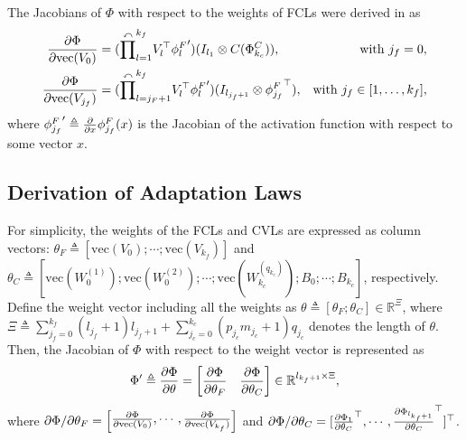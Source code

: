 \documentclass{l4dc2025}
\begin{document}
The Jacobians of $\Phi$ with respect to the weights of FCLs were derived in \cite{DixonDNN} as
\begin{equation}
    \begin{aligned}
    \frac{\partial \Phi}{\partial \text{vec}( V_0)} &= 
        (\overset{\curvearrowleft}\prod^{k_f}_{l=1}  V^\top  _l{\phi^{F}_l}') ( I_{l_{1}} \otimes C(\Phi^C_{k_c})),
    &\text{with }{j_f} =0, \hfilneg
    \\
    {\partial \Phi\over\partial \text{vec}(V_{j_f})} &=  
        (\overset{\curvearrowleft}\prod^{k_f}_{l={j_F}+1} V^\top  _l{\phi^{F}_l}') ( I_{l_{{j_f}+1}} \otimes {\phi_{j_f}^F}^\top  ), 
    &\text{with } {j_f} \in[1,\dots,k_f], \hfilneg
    \end{aligned}
\end{equation}
where ${\phi^F_{j_f}}'\triangleq {\partial \over \partial x} {\phi^F_{j_f}}(x)$ is the Jacobian of the activation function with respect to some vector $x$. 

\subsection{Derivation of Adaptation Laws} 

For simplicity, the weights of the FCLs and CVLs are expressed as column vectors:
$\theta_F \triangleq [\text{vec}( V_{0});\allowbreak\cdots;\text{vec}( V_{k_f})]$ and $\theta_C \triangleq [\text{vec}(W^{(1)}_0);\text{vec}(W^{(2)}_0);\cdots;\text{vec}(W^{(q_{k_c})}_{k_c});B_0;\cdots;B_{k_c}]$, respectively. 
Define the weight vector including all the weights as $\theta\triangleq [\theta_F;\theta_C]\in\mathbb{R}^\Xi$, where $\Xi\triangleq\sum_{j_f=0}^{k_f} (l_{j_f}+1) l_{j_f+1} + {\sum_{j_c=0}^{k_c} (p_{j_c}m_{j_c}+1)q_{j_c}}$ denotes the length of $\theta$. 
Then, the Jacobian of $\Phi$ with respect to the weight vector is represented as
\begin{equation}
    \Phi'\triangleq 
    {\partial \Phi\over\partial \theta} = 
    \begin{bmatrix}
        \dfrac{\partial \Phi}{\partial \theta_F} & \dfrac{\partial \Phi}{\partial \theta_C}
    \end{bmatrix}
    \in\mathbb{R}^{l_{k_f+1}\times \Xi},
\end{equation}  
where
$
{\partial \Phi/\partial  \theta_F} = 
\begin{bmatrix}
    {\partial \Phi\over\partial \text{vec}( V_0)}
    ,\cdots,
    {\partial \Phi\over\partial \text{vec}( V_{k_f})}    
\end{bmatrix}
$ 
and
$
{\partial \Phi/\partial \theta_C} = 
[
    {\partial \Phi_1
    \over
    \partial  \theta_C}^\top  
    ,\cdots,
    {\partial \Phi_{l_{k_f+1}}
    \over
    \partial  \theta_C}^\top      
]^\top
$.
\end{document}

